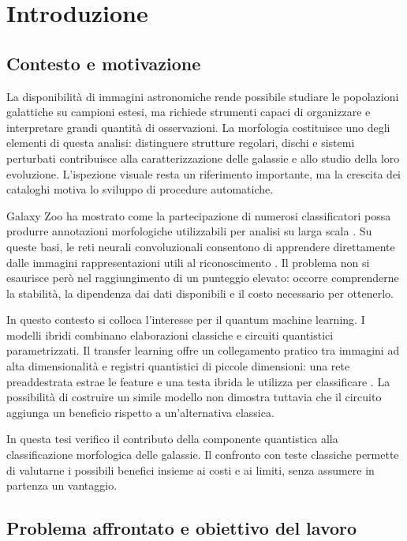 \chapter{Introduzione}
\label{chap:introduzione}

\section{Contesto e motivazione}
\label{sec:intro-contesto}

La disponibilità di immagini astronomiche rende possibile studiare le
popolazioni galattiche su campioni estesi, ma richiede strumenti capaci
di organizzare e interpretare grandi quantità di osservazioni. La
morfologia costituisce uno degli elementi di questa analisi: distinguere
strutture regolari, dischi e sistemi perturbati contribuisce alla
caratterizzazione delle galassie e allo studio della loro evoluzione.
L'ispezione visuale resta un riferimento importante, ma la crescita dei
cataloghi motiva lo sviluppo di procedure automatiche.

Galaxy Zoo ha mostrato come la partecipazione di numerosi classificatori
possa produrre annotazioni morfologiche utilizzabili per analisi su larga
scala \cite{lintott2011galaxyzoo}. Su queste basi, le reti neurali
convoluzionali consentono di apprendere direttamente dalle immagini
rappresentazioni utili al riconoscimento \cite{dieleman2015galaxy}.
Il problema non si esaurisce però nel raggiungimento di un punteggio
elevato: occorre comprenderne la stabilità, la dipendenza dai dati
disponibili e il costo necessario per ottenerlo.

In questo contesto si colloca l'interesse per il quantum machine
learning. I modelli ibridi combinano elaborazioni classiche e circuiti
quantistici parametrizzati. Il transfer learning offre un collegamento
pratico tra immagini ad alta dimensionalità e registri quantistici
di piccole dimensioni: una rete preaddestrata estrae le feature e una
testa ibrida le utilizza per classificare \cite{mari2020transfer}.
La possibilità di costruire un simile modello non dimostra tuttavia
che il circuito aggiunga un beneficio rispetto a un'alternativa classica.

In questa tesi verifico il contributo della componente quantistica
alla classificazione morfologica delle galassie. Il confronto con
teste classiche permette di valutarne i possibili benefici insieme
ai costi e ai limiti, senza assumere in partenza un vantaggio.

\section{Problema affrontato e obiettivo del lavoro}
\label{sec:intro-obiettivo}

